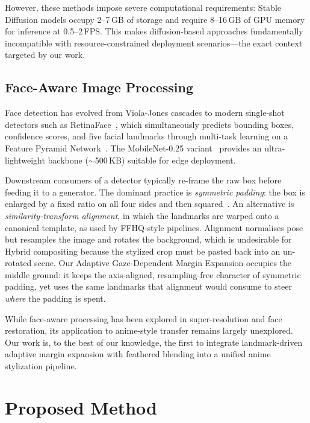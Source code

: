 \documentclass[journal]{IEEEtran}
\begin{document}
However, these methods impose severe computational requirements: Stable Diffusion models occupy 2--7\,GB of storage and require 8--16\,GB of GPU memory for inference at 0.5--2\,FPS. This makes diffusion-based approaches fundamentally incompatible with resource-constrained deployment scenarios---the exact context targeted by our work.

\subsection{Face-Aware Image Processing}

Face detection has evolved from Viola-Jones cascades to modern single-shot detectors such as RetinaFace~\cite{Deng2019RetinaFace}, which simultaneously predicts bounding boxes, confidence scores, and five facial landmarks through multi-task learning on a Feature Pyramid Network~\cite{Lin2017FPN}. The MobileNet-0.25 variant~\cite{Howard2017MobileNet} provides an ultra-lightweight backbone ($\sim$500\,KB) suitable for edge deployment.

Downstream consumers of a detector typically re-frame the raw box before feeding it to a generator. The dominant practice is \textit{symmetric padding}: the box is enlarged by a fixed ratio on all four sides and then squared~\cite{Karras2019, Richardson2021}. An alternative is \textit{similarity-transform alignment}, in which the landmarks are warped onto a canonical template, as used by FFHQ-style pipelines. Alignment normalises pose but resamples the image and rotates the background, which is undesirable for Hybrid compositing because the stylized crop must be pasted back into an un-rotated scene. Our Adaptive Gaze-Dependent Margin Expansion occupies the middle ground: it keeps the axis-aligned, resampling-free character of symmetric padding, yet uses the same landmarks that alignment would consume to steer \textit{where} the padding is spent.

While face-aware processing has been explored in super-resolution and face restoration, its application to anime-style transfer remains largely unexplored. Our work is, to the best of our knowledge, the first to integrate landmark-driven adaptive margin expansion with feathered blending into a unified anime stylization pipeline.


\section{Proposed Method}
\label{sec:method}
\end{document}
